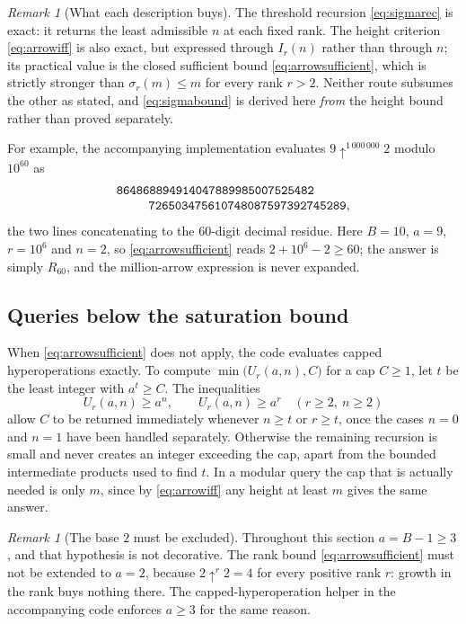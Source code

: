 \documentclass[11pt,letterpaper]{article}
\numberwithin{equation}{section}
\theoremstyle{definition}
\theoremstyle{remark}
\newtheorem{remark}[theorem]{Remark}
\begin{document}
\begin{remark}[What each description buys]
The threshold recursion \eqref{eq:sigmarec} is exact: it returns the least admissible $n$ at each fixed rank. The height criterion \eqref{eq:arrowiff} is also exact, but expressed through $I_r(n)$ rather than through $n$; its practical value is the closed sufficient bound \eqref{eq:arrowsufficient}, which is strictly stronger than $\sigma_r(m)\le m$ for every rank $r>2$. Neither route subsumes the other as stated, and \eqref{eq:sigmabound} is derived here \emph{from} the height bound rather than proved separately.
\end{remark}

For example, the accompanying implementation evaluates
$9\uparrow^{1\,000\,000}2$ modulo $10^{60}$ as
\[
 \begin{split}
 &\texttt{864868894914047889985007525482}\\[-1mm]
 &\hspace{9mm}\texttt{726503475610748087597392745289},
 \end{split}
\]
the two lines concatenating to the $60$-digit decimal residue. Here $B=10$, $a=9$, $r=10^6$ and $n=2$, so \eqref{eq:arrowsufficient} reads $2+10^6-2\ge60$; the answer is simply $R_{60}$, and the million-arrow expression is never expanded.

\subsection{Queries below the saturation bound}\label{sec:capped}

When \eqref{eq:arrowsufficient} does not apply, the code evaluates capped hyperoperations exactly. To compute $\min\bigl(U_r(a,n),C\bigr)$ for a cap $C\ge1$, let $t$ be the least integer with $a^t\ge C$. The inequalities
\[
 U_r(a,n)\ge a^n,\qquad U_r(a,n)\ge a^r\quad(r\ge2,\ n\ge2)
\]
allow $C$ to be returned immediately whenever $n\ge t$ or $r\ge t$, once the cases $n=0$ and $n=1$ have been handled separately. Otherwise the remaining recursion is small and never creates an integer exceeding the cap, apart from the bounded intermediate products used to find $t$. In a modular query the cap that is actually needed is only $m$, since by \eqref{eq:arrowiff} any height at least $m$ gives the same answer.

\begin{remark}[The base $2$ must be excluded]\label{rem:base-two}
Throughout this section $a=B-1\ge3$, and that hypothesis is not decorative. The rank bound \eqref{eq:arrowsufficient} must not be extended to $a=2$, because $2\uparrow^r2=4$ for every positive rank $r$: growth in the rank buys nothing there. The capped-hyperoperation helper in the accompanying code enforces $a\ge3$ for the same reason.
\end{remark}
\end{document}
